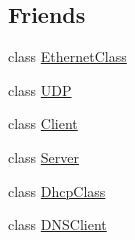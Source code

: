 \subsection*{Friends}
\begin{DoxyCompactItemize}
\item 
class \hyperlink{class_i_p_address_a9a150ffc237e50529b3d0d50cc83a4d7}{Ethernet\-Class}
\item 
class \hyperlink{class_i_p_address_a480cf93423716d22666c9c3f17177736}{U\-D\-P}
\item 
class \hyperlink{class_i_p_address_a5db1c99e2c94b26278f3838c85cdb618}{Client}
\item 
class \hyperlink{class_i_p_address_ac2055578ac48afabe5af487878450f68}{Server}
\item 
class \hyperlink{class_i_p_address_afef6ad9b691e32ea60d87db719e23e15}{Dhcp\-Class}
\item 
class \hyperlink{class_i_p_address_a14acdf960f52e4a43740d57e81a27c40}{D\-N\-S\-Client}
\end{DoxyCompactItemize}


